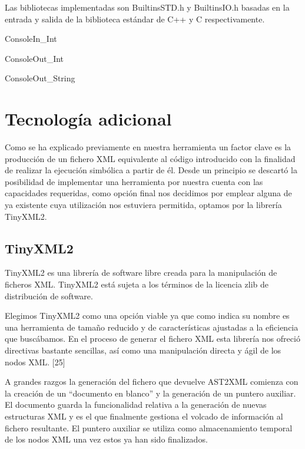 Las bibliotecas implementadas son BuiltinsSTD.h y BuiltinsIO.h basadas en la entrada y salida de la biblioteca est\'andar de C++ y C respectivamente.

\begin{center}
ConsoleIn\_Int

ConsoleOut\_Int

ConsoleOut\_String

\end{center}

\section{Tecnolog\'ia adicional}

Como se ha explicado previamente en nuestra herramienta un factor clave es la producci\'on de un fichero XML equivalente al c\'odigo introducido con la finalidad de realizar la ejecuci\'on simb\'olica a partir de \'el. Desde un principio se descart\'o la posibilidad de implementar una herramienta por nuestra cuenta con las capacidades requeridas, como opci\'on final nos decidimos por emplear alguna de ya existente cuya utilizaci\'on nos estuviera permitida, optamos por la librer\'ia TinyXML2.

\subsection*{TinyXML2}

TinyXML2 es una librer\'ia de software libre creada para la manipulaci\'on de ficheros XML. TinyXML2 est\'a sujeta a los t\'erminos de la licencia zlib de distribuci\'on de software.

Elegimos TinyXML2 como una opci\'on viable ya que como indica su nombre es una herramienta de tama\~no reducido y de caracter\'isticas ajustadas a la eficiencia que busc\'abamos. En el proceso de generar el fichero XML esta librer\'ia nos ofreci\'o directivas bastante sencillas, as\'i como una manipulaci\'on directa y \'agil de los nodos XML. [25]

A grandes razgos la generaci\'on del fichero que devuelve AST2XML comienza con la creaci\'on de un ``documento en blanco'' y la generaci\'on de un puntero auxiliar. El documento guarda la funcionalidad relativa a la generaci\'on de nuevas estructuras XML y es el que finalmente gestiona el volcado de informaci\'on al fichero resultante. El puntero auxiliar se utiliza como almacenamiento temporal de los nodos XML una vez estos ya han sido finalizados.

